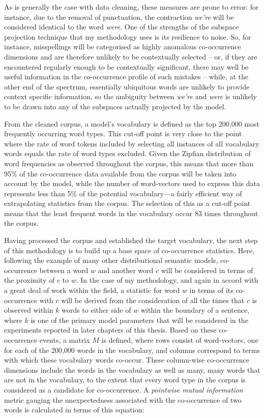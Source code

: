 As is generally the case with data cleaning, these measures are prone to error: for instance, due to the removal of punctuation, the contraction \emph{we're} will be considered identical to the word \emph{were}.  One of the strengths of the subspace projection technique that my methodology uses is its resilience to noise.  So, for instance, misspellings will be categorised as highly anomalous co-occurrence dimensions and are therefore unlikely to be contextually selected -- or, if they are encountered regularly enough to be contextually significant, there may well be useful information in the co-occurrence profile of such mistakes -- while, at the other end of the spectrum, essentially ubiquitous words are unlikely to provide context specific information, so the ambiguity between \emph{we're} and \emph{were} is unlikely to be drawn into any of the subspaces actually projected by the model.

From the cleaned corpus, a model's vocabulary is defined as the top 200,000 most frequently occurring word types.  This cut-off point is very close to the point where the rate of word tokens included by selecting all instances of all vocabulary words equals the rate of word types excluded.  Given the Zipfian distribution of word frequencies as observed throughout the corpus, this means that more than 95\% of the co-occurrence data available from the corpus will be taken into account by the model, while the number of word-vectors used to express this data represents less than 5\% of the potential vocabulary---a fairly efficient way of extrapolating statistics from the corpus.  The selection of this as a cut-off point means that the least frequent words in the vocabulary occur 83 times throughout the corpus.

Having processed the corpus and established the target vocabulary, the next step of this methodology is to build up a base space of co-occurrence statistics.  Here, following the example of many other distributional semantic models, co-occurrence between a word $w$ and another word $c$ will be considered in terms of the proximity of $c$ to $w$.  In the case of my methodology, and again in accord with a great deal of work within the field, a statistic for word $w$ in terms of its co-occurrence with $c$ will be derived from the consideration of all the times that $c$ is observed within $k$ words to either side of $w$ within the boundary of a sentence, where $k$ is one of the primary model parameters that will be considered in the experiments reported in later chapters of this thesis.  Based on these co-occurrence events, a matrix $M$ is defined, where rows consist of word-vectors, one for each of the 200,000 words in the vocabulary, and columns correspond to terms with which these vocabulary words co-occur.  These column-wise co-occurrence dimensions include the words in the vocabulary as well as many, many words that are not in the vocabulary, to the extent that every word type in the corpus is considered as a candidate for co-occurrence.  A \emph{pointwise mutual information} metric gauging the unexpectedness associated with the co-occurrence of two words is calculated in terms of this equation:

